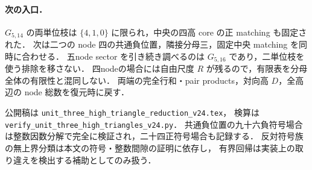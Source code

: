 \paragraph{次の入口．}
$G_{5,14}$ の両単位枝は $\{4,1,0\}$ に限られ，中央の四高 core の正 matching も固定された．
次は二つの node 四の共通負位置，隣接分母三，固定中央 matching を同時に合わせる．
五node sector を引き続き調べるのは $G_{5,16}$ であり，二単位枝を使う排除を移さない．
四nodeの場合には自由尺度 $R$ が残るので，有限表を分母全体の有限性と混同しない．
両端の完全行和・pair products，対向高 $D$，全高辺の node 総数を復元時に戻す．

公開稿は \nolinkurl{unit_three_high_triangle_reduction_v24.tex}，
検算は \nolinkurl{verify_unit_three_high_triangles_v24.py}．
共通負位置の九十六負符号場合は整数因数分解で完全に検証され，二十四正符号場合も記録する．
反対符号族の無上界分類は本文の符号・整数間隙の証明に依存し，
有界回帰は実装上の取り違えを検出する補助としてのみ扱う．
